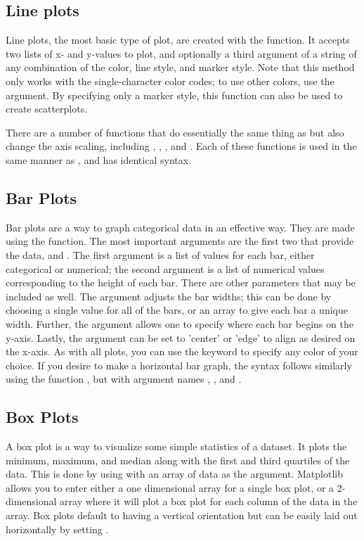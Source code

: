 \subsection*{Line plots}
Line plots, the most basic type of plot, are created with the  function.
It accepts two lists of x- and y-values to plot, and optionally a third argument of a string of any combination of the color, line style, and marker style.
Note that this method only works with the single-character color codes; to use other colors, use the  argument.
By specifying only a marker style, this function can also be used to create scatterplots.

There are a number of functions that do essentially the same thing as  but also change the axis scaling, including , , , and .
Each of these functions is used in the same manner as , and has identical syntax.

\subsection*{Bar Plots}
Bar plots are a way to graph categorical data in an effective way. They are made using the  function. The most important arguments are the first two that provide the data,  and . The first argument is a list of values for each bar, either categorical or numerical; the second argument is a list of numerical values corresponding to the height of each bar. There are other parameters that may be included as well. The  argument adjusts the bar widths; this can be done by choosing a single value for all of the bars, or an array to give each bar a unique width. Further, the argument  allows one to specify where each bar begins on the y-axis. Lastly, the  argument can be set to 'center' or 'edge' to align as desired on the x-axis. As with all plots, you can use the  keyword to specify any color of your choice. 
If you desire to make a horizontal bar graph, the syntax follows similarly using the function , but with argument names , ,  and .

\subsection*{Box Plots}
A box plot is a way to visualize some simple statistics of a dataset. It plots the minimum, maximum, and median along with the first and third quartiles of the data. This is done by using  with an array of data as the argument. Matplotlib allows you to enter either a one dimensional array for a single box plot, or a 2-dimensional array where it will plot a box plot for each column of the data in the array. Box plots default to having a vertical orientation but can be easily laid out horizontally by setting .

